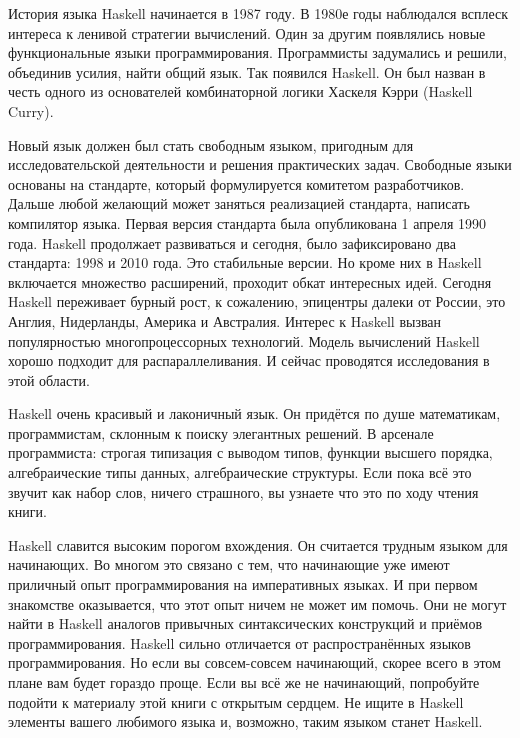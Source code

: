 
История языка Haskell начинается в 1987 году. 
В 1980е годы наблюдался всплеск интереса к ленивой
стратегии вычислений. 
Один за другим появлялись новые функциональные
языки программирования. Программисты задумались и решили, 
объединив усилия, найти общий язык. Так появился 
Haskell. Он был назван в честь одного из основателей 
комбинаторной логики Хаскеля Кэрри (Haskell Curry). 

Новый язык должен был стать свободным языком, пригодным
для исследовательской деятельности и решения практических задач.
Свободные языки основаны на стандарте, который формулируется
комитетом разработчиков. Дальше любой желающий может 
заняться реализацией стандарта, написать компилятор языка.
Первая версия стандарта была опубликована 1 апреля
1990 года.
Haskell продолжает развиваться и сегодня, было зафиксировано
два стандарта: 1998 и 2010 года. Это стабильные версии.
Но кроме них в Haskell включается множество расширений,
проходит обкат интересных идей. 
Сегодня Haskell переживает бурный рост, к сожалению, 
эпицентры далеки от России, это Англия, Нидерланды, Америка 
и Австралия. Интерес к Haskell вызван популярностью
многопроцессорных технологий. Модель вычислений Haskell
хорошо подходит для распараллеливания. И сейчас проводятся 
исследования в этой области.

Haskell очень красивый и лаконичный язык.
Он придётся по душе математикам, программистам, склонным
к поиску элегантных решений. В арсенале программиста:
строгая типизация с выводом типов, функции высшего порядка, 
алгебраические типы данных, алгебраические структуры. 
Если пока всё это звучит как набор слов, ничего страшного,
вы узнаете что это по ходу чтения книги.


Haskell славится высоким порогом вхождения. 
Он считается трудным языком для начинающих.
Во многом это связано с тем, что начинающие уже имеют
приличный опыт программирования на императивных языках. И при
первом знакомстве оказывается, что этот опыт ничем не может
им помочь. Они не могут найти в Haskell аналогов привычных
синтаксических конструкций и приёмов программирования. 
Haskell сильно отличается от распространённых
языков программирования. Но если вы совсем-совсем начинающий,
скорее всего в этом плане вам будет гораздо проще. 
Если вы всё же не начинающий, попробуйте подойти к материалу
этой книги с открытым сердцем. Не ищите в Haskell
элементы вашего любимого языка и, возможно, таким
языком станет Haskell.

